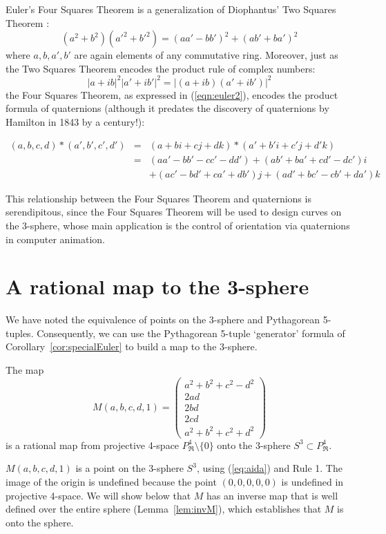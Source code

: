 \begin{rmk}
Euler's Four Squares Theorem is a generalization of 
Diophantus' Two Squares Theorem \cite{dickson52}:
\begin{equation}
(a^2 + b^2)(a'^2 + b'^2) = (aa' - bb')^2 + (ab' + ba')^2
\end{equation}
where $a,b,a',b'$ are again elements of any commutative ring.
Moreover, just as the Two Squares Theorem encodes the product rule 
of complex numbers:
\[
| a+ib |^2 | a'+ib' |^2 = | (a+ib)(a'+ib') |^2 
\]
the Four Squares Theorem, as expressed in (\ref{eqn:euler2}),
encodes the product formula of quaternions
(although it predates the discovery of quaternions 
by Hamilton in 1843 by a century!):

\begin{equation}
\begin{array}{lll}
(a,b,c,d) * (a',b',c',d') & = & (a + bi + cj + dk) * (a' + b'i + c'j + d'k) \\
& = & (aa' - bb' - cc' - dd') + (ab' + ba' + cd' - dc')i \\
& & + (ac' - bd' + ca' + db')j + (ad' + bc' - cb' + da')k
\end{array}
\end{equation}

This relationship between the Four Squares Theorem and quaternions is
serendipitous, since the Four Squares Theorem will be
used to design curves on the 3-sphere, whose main application is the
control of orientation via quaternions in computer animation.
\end{rmk}

\section{A rational map to the 3-sphere}
\label{sec:M}

We have noted the equivalence of points on the 3-sphere and Pythagorean
5-tuples.
Consequently, we can use the Pythagorean 5-tuple `generator' formula
of Corollary~\ref{cor:specialEuler} to build a map to the 3-sphere.

\begin{lemma}
\label{lem:M}
The map
\begin{equation}
\label{eq:M}
	M(a,b,c,d,1) = \left( \begin{array}{c}
		a^2+b^2+c^2-d^2 \\
		2ad \\
		2bd \\
		2cd \\
		a^2+b^2+c^2+d^2
		\end{array} \right)
\end{equation}
is a rational map from projective 4-space $P^4_{\Re} \setminus \{0\}$ 
onto the 3-sphere $S^3 \subset P^4_{\Re}$.
\end{lemma}
\prf
$M(a,b,c,d,1)$ is a point on the 3-sphere $S^3$,
using (\ref{eq:aida}) and Rule 1.
The image of the origin is undefined because 
the point $(0,0,0,0,0)$ is undefined in projective 4-space.
We will show below that $M$ has an inverse map that is well defined over the
entire sphere (Lemma~\ref{lem:invM}), 
which establishes that $M$ is onto the sphere.
\QED

